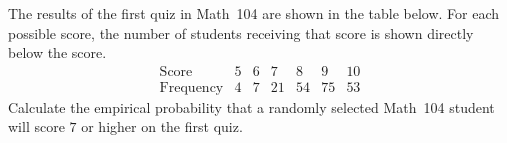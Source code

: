 \documentclass[addpoints,12pt]{exam}
\begin{document}
\begin{questions}

\question[10] The results of the first quiz in Math~104 are
shown in the table below. For each possible score, the number
of students receiving that score is shown directly below
the score.
\[\begin{array}{c|ccccccc}
\text{Score}&5&6&7&8&9&10\\\hline
\text{Frequency}&4&7&21&54&75&53
\end{array}\]
Calculate the empirical probability that a randomly
selected Math~104 student will score $7$ or higher
on the first quiz.

\end{questions}
\end{document}
